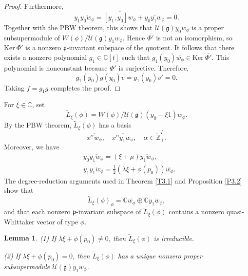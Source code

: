 \documentclass[12pt,reqno]{article}
\newtheorem{lem}[thm]{Lemma}
\def\o{\overline}
\def\a{\alpha}
\def\la{\lambda}
\def\F{\mathfrak}
\def\r{\mathrm}
\def\C{\mathcal}
\def\CC{\mathbb{C}}
\def\ZZ{\mathbb{Z}}
\def\beqn{\begin{equation*}}
\def\eeqn{\end{equation*}}
\def\beq{\begin{equation}}
\def\eeq{\end{equation}}
\def\({\left(}
\def\){\right)}
\begin{document}
\begin{proof}
Furthermore,
\beqn
y_1\o{y_0w_\phi}=\o{[y_1,y_0]w_\phi}+\o{y_0y_1w_\phi}=0.
\eeqn
Together with the PBW theorem, this shows that $\C{U}(\F{g})\o{y_0w_\phi}$ is a proper subsupermodule of $W(\phi)/\C{U}(\F{g})y_1w_\phi$. Hence $\o{\Phi'}$ is not an isomorphism, so $\r{Ker}~\o{\Phi'}$ is a nonzero $\F{p}$-invariant subspace of the quotient. It follows that there exists a nonzero polynomial $g_1\in\CC[t]$ such that $g_1(y_0)\o{w_\phi}\in\r{Ker}~\o{\Phi'}$. This polynomial is nonconstant because $\o{\Phi'}$ is surjective. Therefore,
\beqn
g_1(y_0)g(y_0)v=g_1(y_0)v'=0.
\eeqn
Taking $f=g_1g$ completes the proof.
\end{proof}


For $\xi\in\CC$, set 
\beq
\widetilde{L}_\xi(\phi)=W(\phi)/\C{U}(\F{g})(y_0-\xi1)w_\phi.
\eeq
By the PBW theorem, $\widetilde{L}_\xi(\phi)$ has a basis 
\beqn
\o{x^\a w_\phi},\quad \o{x^\a y_1w_\phi},\quad \a\in\widetilde{\ZZ}_+^I.
\eeqn
Moreover, we have
\begin{align}
&y_0\o{y_1w_\phi}=(\xi+\mu)\o{y_1w_\phi},\label{F3.5}\\ 
&y_1\o{y_1w_\phi}=\frac{1}{2}\(\la\xi+\phi(p_0)\)\o{w_\phi}.\label{F3.6}
\end{align}
The degree-reduction arguments used in Theorem \ref{T3.1} and Proposition \ref{P3.2} show that
\beq
\widetilde{L}_\xi(\phi)_\phi=\CC \o{w_\phi}\oplus\CC \o{y_1w_\phi},
\eeq
and that each nonzero $\F{p}$-invariant subspace of $\widetilde{L}_\xi(\phi)$ contains a nonzero quasi-Whittaker vector of type $\phi$.

\begin{lem}\label{L3.9}
(1) If $\la\xi+\phi(p_0)\neq 0$, then $\widetilde{L}_\xi(\phi)$ is irreducible.

(2) If $\la\xi+\phi(p_0)=0$, then $\widetilde{L}_\xi(\phi)$ has a unique nonzero proper subsupermodule $\C{U}(\F{g})\o{y_1w_\phi}$.
\end{lem}
\end{document}
